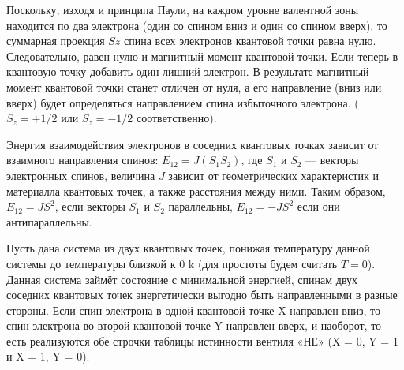 \documentclass[14pt]{article}
\begin{document}
Поскольку, изходя и принципа Паули,  на каждом уровне валентной зоны находится по два электрона
(один со спином вниз и один со спином вверх), то суммарная проекция $Sz$ спина всех электронов квантовой
точки равна нулю. Следовательно, равен нулю и магнитный момент квантовой точки. Если теперь в
квантовую точку добавить один лишний электрон.  В результате магнитный момент
квантовой точки станет отличен от нуля, а его направление (вниз или вверх) будет определяться направлением спина избыточного электрона. ($S_{z} = +1/2$ или $S_{z} = -1/2$ соответственно).

Энергия взаимодействия электронов в соседних квантовых точках зависит от взаимного направления спинов:
$E_{12} = J(S_{1}S_{2})$, где $S_{1}$ и $S_{2}$ --- векторы электронных спинов, величина $J$ зависит от геометрических характеристик и материалла квантовых точек, а также расстояния между ними.
Таким образом, $E_{12} = JS^{2}$, если векторы $S_{1}$ и $S_{2}$ параллельны, $E_{12} = -JS^{2}$ если они антипараллельны.

Пусть дана система из двух квантовых точек, понижая температуру данной системы до температуры близкой к 0 k (для простоты будем считать $T = 0$). Данная система займёт состояние с минимальной энергией, спинам двух соседних квантовых точек энергетически выгодно быть направленными в разные стороны. Если спин электрона в одной квантовой точке X направлен вниз, то спин электрона во второй квантовой точке  Y направлен вверх, и наоборот, то есть реализуются обе  строчки таблицы истинности вентиля «НЕ» (X = 0, Y = 1
и X = 1, Y = 0).












\newpage


\end{document}
